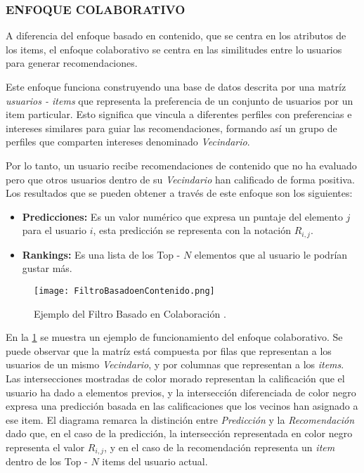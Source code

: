 \subsubsection[COLABORATIVO]{ENFOQUE COLABORATIVO}

A diferencia del enfoque basado en contenido, que se centra en los atributos de los items, el enfoque colaborativo se centra en las similitudes entre lo usuarios para generar recomendaciones.

Este enfoque funciona construyendo una base de datos descrita por una matríz \textit{usuarios - items} que representa la preferencia de un conjunto de usuarios por un item particular. Esto significa que vincula a diferentes perfiles con preferencias e intereses similares para guiar las recomendaciones, formando así un grupo  de perfiles que comparten intereses denominado \textit{Vecindario}. 


Por lo tanto, un usuario recibe recomendaciones de contenido que no ha evaluado pero que otros usuarios dentro de su \textit{Vecindario} han calificado de forma positiva. Los resultados que se pueden obtener a través de este enfoque son los siguientes:

\begin{itemize}
    \item \textbf{Predicciones: } Es un valor numérico que expresa un puntaje del elemento $j$ para el usuario $i$, esta predicción se representa con la notación $R_{i,j}$.
    \item \textbf{Rankings: } Es una lista de los Top - $N$ elementos que al usuario le podrían gustar más.
\end{itemize}

\begin{figure}[h!]
    \centering
    \texttt{[image: FiltroBasadoenContenido.png]}
    \caption{Ejemplo del Filtro Basado en Colaboración \parencite{ISINKAYE2015261}.}
    \label{fig:FiltroColaborativo}
\end{figure}

En la \cref{fig:FiltroColaborativo} se muestra un ejemplo de funcionamiento del enfoque colaborativo. Se puede observar que la matríz está compuesta por filas que representan a los usuarios de un mismo \textit{Vecindario}, y por columnas que representan a los \textit{items}. Las intersecciones mostradas de color morado representan la calificación que el usuario ha dado a elementos previos, y la intersección diferenciada de color negro expresa una predicción basada en las calificaciones que los vecinos han asignado a ese item.
El diagrama remarca la distinción entre \textit{Predicción} y la \textit{Recomendación} dado que, en el caso de la predicción,  la intersección representada en color negro representa el valor $R_{i,j}$, y en el caso de la recomendación representa un \textit{item} dentro de los Top - $N$ items del usuario actual.

